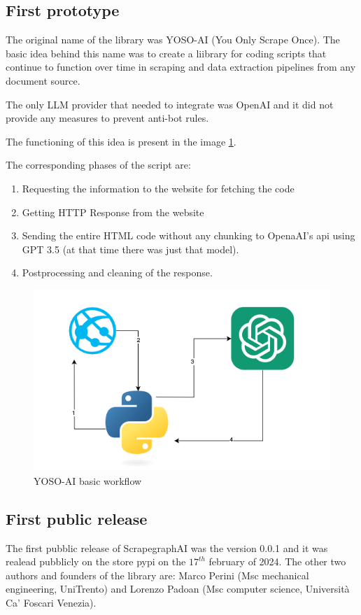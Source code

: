 \subsection{First prototype}

The original name of the library was YOSO-AI (You Only Scrape Once). The basic idea behind this name was to create a liibrary for coding scripts that continue to function over time in scraping and data extraction pipelines from any document source.

The only LLM provider that needed to integrate was OpenAI and it did not provide any measures to prevent anti-bot rules.

The functioning of this idea is present in the image 
\ref{fig:yoso}.

The corresponding phases of the script are:
\begin{enumerate}
    \item Requesting the information to the website for fetching the code
    \item Getting HTTP Response from the website
    \item Sending the entire HTML code without any chunking to OpenaAI's api using GPT 3.5 (at that time there was just that model). 
    \item Postprocessing and cleaning of the response. 
\end{enumerate}

\begin{figure}[H]
    \centering
    \includegraphics[scale=0.7]{Assets/YOSO.png}
    \caption{YOSO-AI basic workflow}
    \label{fig:yoso}
\end{figure}

\subsection{First public release}
The first pubblic release of ScrapegraphAI  was the version 0.0.1 and it was realead pubblicly on the store pypi on the $17^{th}$ february of 2024. The other two authors and founders of the library are: Marco Perini (Msc mechanical engineering, UniTrento) and Lorenzo Padoan (Msc computer science, Università Ca'​ Foscari Venezia).

